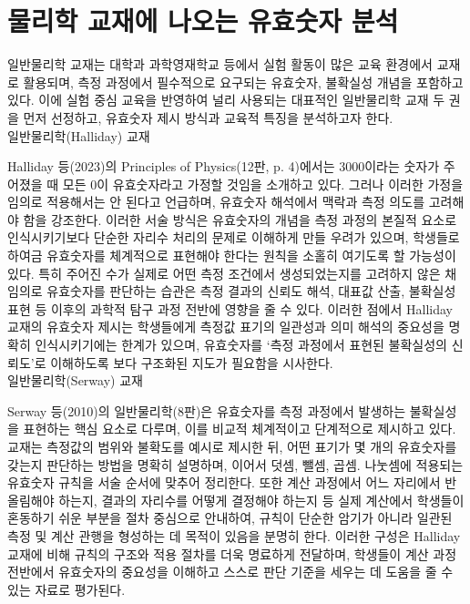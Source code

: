 \section{물리학 교재에 나오는 유효숫자 분석}
\ganadareset



일반물리학 교재는 대학과 과학영재학교 등에서 실험 활동이 많은 교육 환경에서 교재로 활용되며,
측정 과정에서 필수적으로 요구되는 유효숫자, 불확실성 개념을 포함하고 있다.
%
이에 실험 중심 교육을 반영하여 널리 사용되는 대표적인 일반물리학 교재 두 권을 먼저 선정하고,
유효숫자 제시 방식과 교육적 특징을 분석하고자 한다. \\

\ganada 일반물리학(Halliday) 교재

Halliday 등(2023)의 Principles of Physics(12판, p. 4)에서는
3000이라는 숫자가 주어졌을 때 모든 0이 유효숫자라고 가정할 것임을 소개하고 있다.
%
그러나 이러한 가정을 임의로 적용해서는 안 된다고 언급하며,
유효숫자 해석에서 맥락과 측정 의도를 고려해야 함을 강조한다.
%
이러한 서술 방식은 유효숫자의 개념을 측정 과정의 본질적 요소로 인식시키기보다
단순한 자리수 처리의 문제로 이해하게 만들 우려가 있으며,
학생들로 하여금 유효숫자를 체계적으로 표현해야 한다는 원칙을 소홀히 여기도록 할 가능성이 있다.
%
특히 주어진 수가 실제로 어떤 측정 조건에서 생성되었는지를 고려하지 않은 채 임의로
유효숫자를 판단하는 습관은 측정 결과의 신뢰도 해석, 대표값 산출, 불확실성 표현 등
이후의 과학적 탐구 과정 전반에 영향을 줄 수 있다.
%
이러한 점에서 Halliday 교재의 유효숫자 제시는 학생들에게 측정값 표기의 일관성과
의미 해석의 중요성을 명확히 인식시키기에는 한계가 있으며,
유효숫자를 `측정 과정에서 표현된 불확실성의 신뢰도'로 이해하도록 보다 구조화된 지도가 필요함을 시사한다. \\

\ganada 일반물리학(Serway) 교재

Serway 등(2010)의 일반물리학(8판)은 유효숫자를 측정 과정에서 발생하는 불확실성을
표현하는 핵심 요소로 다루며, 이를 비교적 체계적이고 단계적으로 제시하고 있다.
%
교재는 측정값의 범위와 불확도를 예시로 제시한 뒤, 어떤 표기가 몇 개의 유효숫자를 갖는지 판단하는 방법을
명확히 설명하며, 이어서 덧셈, 뺄셈, 곱셈. 나눗셈에 적용되는 유효숫자 규칙을 서술 순서에 맞추어 정리한다.
%
또한 계산 과정에서 어느 자리에서 반올림해야 하는지, 결과의 자리수를 어떻게 결정해야 하는지 등
실제 계산에서 학생들이 혼동하기 쉬운 부분을 절차 중심으로 안내하여,
규칙이 단순한 암기가 아니라 일관된 측정 및 계산 관행을 형성하는 데 목적이 있음을 분명히 한다.
%
이러한 구성은 Halliday 교재에 비해 규칙의 구조와 적용 절차를 더욱 명료하게 전달하며,
학생들이 계산 과정 전반에서 유효숫자의 중요성을 이해하고 스스로 판단 기준을 세우는 데
도움을 줄 수 있는 자료로 평가된다. \\

